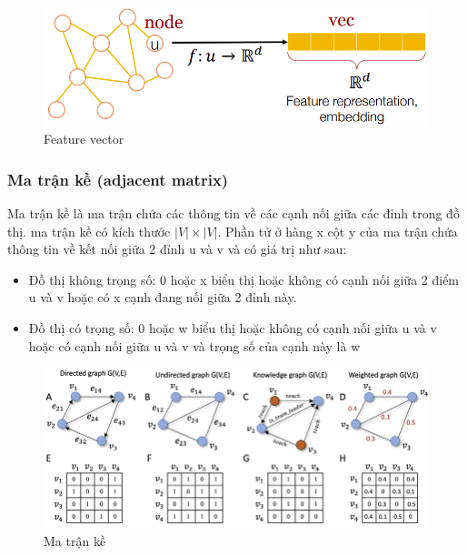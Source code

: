 \begin{figure}[H]
    \begin{center}
        \includegraphics[scale=0.5]{images/feature-vector}
        \caption{Feature vector}
        \label{fig:feature-vector}
    \end{center}
\end{figure}


\subsubsection{Ma trận kề (adjacent matrix)}

Ma trận kề là ma trận chứa các thông tin về các cạnh nối giữa các đỉnh trong đồ thị. ma trận kề có kích thước $|V| \times |V|$. Phần tử ở hàng x cột y của ma trận chứa thông tin về kết nối giữa 2 đỉnh u và v và có giá trị như sau:
\begin{itemize}
	\item Đồ thị không trọng số: 0 hoặc x biểu thị hoặc không có cạnh nối giữa 2 điểm u và v hoặc có x cạnh đang nối giữa 2 đỉnh này.
	\item Đồ thị có trọng số: 0 hoặc w biểu thị hoặc không có cạnh nối giữa u và v hoặc có cạnh nối giữa u và v và trọng số của cạnh này là w
\end{itemize}

\begin{figure}[H]
    \begin{center}
        \includegraphics[scale=0.5]{images/adj-matrix}
        \caption{Ma trận kề}
        \label{fig:adj-matrix}
    \end{center}
\end{figure}


